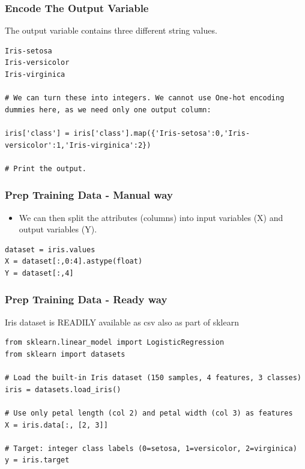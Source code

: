 \begin{frame}[fragile]\frametitle{Encode The Output Variable}
The output variable contains three different string values.
\begin{lstlisting}
Iris-setosa
Iris-versicolor
Iris-virginica

# We can turn these into integers. We cannot use One-hot encoding dummies here, as we need only one output column:

iris['class'] = iris['class'].map({'Iris-setosa':0,'Iris-versicolor':1,'Iris-virginica':2})

# Print the output.
\end{lstlisting}



\end{frame}

\begin{frame}[fragile]\frametitle{Prep Training Data - Manual way}
\begin{itemize}
\item We can then split the attributes (columns) into input variables (X) and output variables (Y).
\end{itemize}
\begin{lstlisting}
dataset = iris.values
X = dataset[:,0:4].astype(float)
Y = dataset[:,4]
\end{lstlisting}
\end{frame}


\begin{frame}[fragile]\frametitle{Prep Training Data - Ready way}
Iris dataset is READILY available as csv also as part of sklearn
\begin{lstlisting}
from sklearn.linear_model import LogisticRegression
from sklearn import datasets

# Load the built-in Iris dataset (150 samples, 4 features, 3 classes)
iris = datasets.load_iris()

# Use only petal length (col 2) and petal width (col 3) as features
X = iris.data[:, [2, 3]]

# Target: integer class labels (0=setosa, 1=versicolor, 2=virginica)
y = iris.target
\end{lstlisting}

\end{frame}

